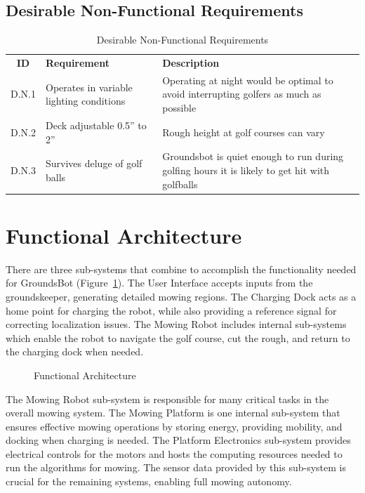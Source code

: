 \documentclass{article}
\begin{document}
\subsection{Desirable Non-Functional Requirements}
\begin{center}
  \begin{table}
  	\caption{Desirable Non-Functional Requirements}
  	\label{table: desirable non-functional}
  	\def\arraystretch{1.5}
	\begin{tabularx}{\textwidth}{ cXX }
  	  \textbf{ID} & \textbf{Requirement} &
  	  \textbf{Description} \\
  	  D.N.1 &
  	  Operates in variable lighting conditions &
  	  Operating at night would be optimal to avoid interrupting golfers as much as possible\\
  	  D.N.2 &
  	  Deck adjustable 0.5” to 2” &
  	  Rough height at golf courses can vary\\
  	  D.N.3 &
  	  Survives deluge of golf balls &
  	  Groundsbot is quiet enough to run during golfing hours it is likely to get hit with golfballs\\
	\end{tabularx}
  \end{table}
\end{center}

\section{Functional Architecture}
  There are three sub-systems that combine to accomplish the functionality needed for GroundsBot (Figure~\ref{fig:functional}). The User Interface accepts inputs from the groundskeeper, generating detailed mowing regions. The Charging Dock acts as a home point for charging the robot, while also providing a reference signal for correcting localization issues. The Mowing Robot includes internal sub-systems which enable the robot to navigate the golf course, cut the rough, and return to the charging dock when needed.\\
  
\begin{figure}[H]
\centering
\def\svgwidth{\columnwidth}

\caption{Functional Architecture}
\label{fig:functional}
\end{figure}

  The Mowing Robot sub-system is responsible for many critical tasks in the overall mowing system. The Mowing Platform is one internal sub-system that ensures effective mowing operations by storing energy, providing mobility, and docking when charging is needed. The Platform Electronics sub-system provides electrical controls for the motors and hosts the computing resources needed to run the algorithms for mowing. The sensor data provided by this sub-system is crucial for the remaining systems, enabling full mowing autonomy.\\
  
\end{document}
